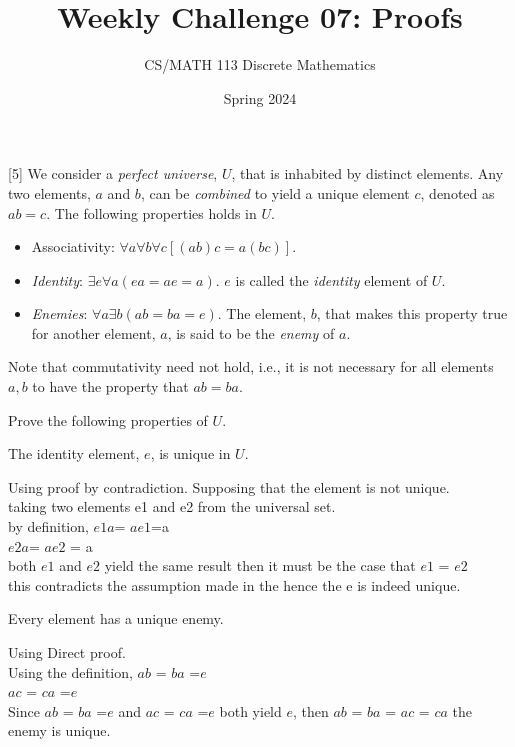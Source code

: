 \documentclass[a4paper]{exam}
\title{Weekly Challenge 07: Proofs}
\author{CS/MATH 113 Discrete Mathematics}
\date{Spring 2024}
\begin{document}
\maketitle

\begin{questions}

[5]
  We consider a \textit{perfect universe}, $U$, that is inhabited by distinct elements. Any two elements, $a$ and $b$, can be \textit{combined} to yield a unique element $c$, denoted as $ab=c$. The following properties holds in $U$.
  \begin{itemize}
  \item Associativity: $\forall a\forall b\forall c [(ab)c = a(bc)]$. 
  \item \textit{Identity}: $\exists e\forall a (ea=ae=a)$. $e$ is called the \textit{identity} element of $U$.
  \item \textit{Enemies}: $\forall a\exists b (ab= ba = e)$. The element, $b$, that makes this property true for another element, $a$, is said to be the \textit{enemy} of $a$.
  \end{itemize}
  Note that commutativity need not hold, i.e., it is not necessary for all elements $a, b$ to have the property that $ab=ba$.

  Prove the following properties of $U$.
  \begin{parts}
  \item The identity element, $e$, is unique in $U$.
    \begin{solution}

      Using proof by contradiction.
      Supposing that the element is not unique.\\
      taking two elements e1 and e2 from the universal set.\\
      by definition, $e1a$= $ae1$=a\\
      $e2a$= $ae2$ = a \\
      both $e1$ and $e2$ yield the same result then it must be the case that $e1$ = $e2$\\
      this contradicts the assumption made in the  hence the e is indeed unique.
    \end{solution}
  \item Every element has a unique enemy.
    \begin{solution}
      
      Using Direct proof.\\
      Using the definition, $ab$ = $ba$ =$e$\\
      $ac$ = $ca$ =$e$\\
      Since $ab$ = $ba$ =$e$ and  $ac$ = $ca$ =$e$ both yield $e$, then $ab$ = $ba$ = $ac$ = $ca$ the enemy is unique.
      

\end{solution}
\end{parts}
\end{questions}
\end{document}
